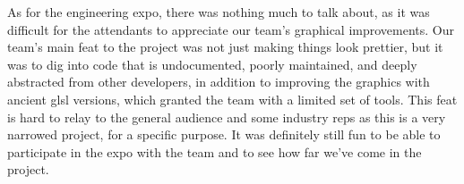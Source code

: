 {As for the engineering expo, there was nothing much to talk about, as it was difficult for the attendants to appreciate our team's graphical improvements. 
Our team's main feat to the project was not just making things look prettier, but it was to dig into code that is undocumented, poorly maintained, and deeply abstracted from other developers, in addition to improving the graphics with ancient glsl versions, which granted the team with a limited set of tools. 
This feat is hard to relay to the general audience and some industry reps as this is a very narrowed project, for a specific purpose. It was definitely still fun to be able to participate in the expo with the team and to see how far we've come in the project.  \\ \par \vspace{3mm}

}

\newpage